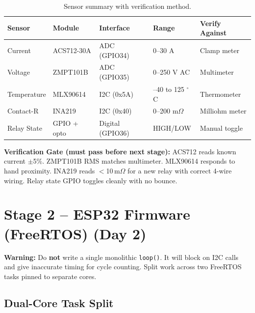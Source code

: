 \documentclass[12pt,a4paper]{article}
\newenvironment{warnbox}{%
  \begin{mdframed}[backgroundcolor=warnbg,linecolor=warnln,linewidth=1.5pt,
    innerleftmargin=9pt,innerrightmargin=9pt,innertopmargin=5pt,innerbottommargin=5pt]
  \textbf{\color{warnln}Warning: }}{\end{mdframed}}
\newenvironment{checkgate}{%
  \begin{mdframed}[backgroundcolor=yellow!10,linecolor=orange!70,linewidth=1.5pt,
    innerleftmargin=9pt,innerrightmargin=9pt,innertopmargin=5pt,innerbottommargin=5pt]
  \textbf{\color{orange!70!black}Verification Gate (must pass before next stage): }}{\end{mdframed}}
\begin{document}
\begin{table}[H]
\centering
\begin{tabular}{lllll}
\toprule
\textbf{Sensor} & \textbf{Module} & \textbf{Interface} & \textbf{Range} & \textbf{Verify Against} \\
\midrule
Current       & ACS712-30A     & ADC (GPIO34)      & 0--30 A         & Clamp meter \\
Voltage       & ZMPT101B       & ADC (GPIO35)      & 0--250 V AC     & Multimeter \\
Temperature   & MLX90614       & I2C (0x5A)        & --40 to 125 $^\circ$C & Thermometer \\
Contact-R     & INA219         & I2C (0x40)        & 0--200 m$\Omega$& Milliohm meter \\
Relay State   & GPIO + opto    & Digital (GPIO36)  & HIGH/LOW        & Manual toggle \\
\bottomrule
\end{tabular}
\caption{Sensor summary with verification method.}
\end{table}

\begin{checkgate}
ACS712 reads known current $\pm$5\%. ZMPT101B RMS matches multimeter. MLX90614 responds to hand
proximity. INA219 reads $<$10\,m$\Omega$ for a new relay with correct 4-wire wiring. Relay state GPIO
toggles cleanly with no bounce.
\end{checkgate}

\section{Stage 2 -- ESP32 Firmware (FreeRTOS) (Day 2)}

\begin{warnbox}
Do \textbf{not} write a single monolithic \texttt{loop()}. It will block on I2C calls and give inaccurate
timing for cycle counting. Split work across two FreeRTOS tasks pinned to separate cores.
\end{warnbox}

\subsection{Dual-Core Task Split}
\end{document}
